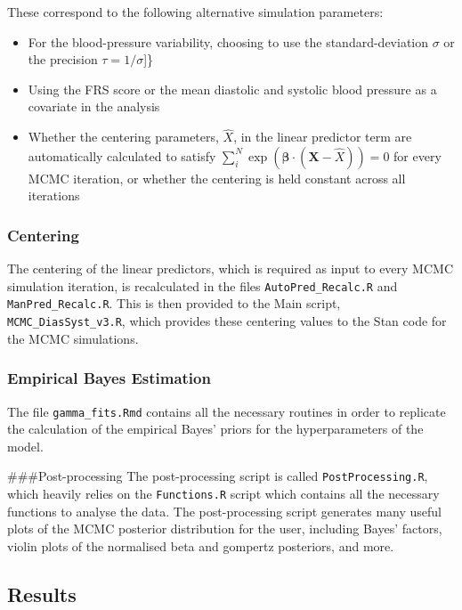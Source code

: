 \documentclass[
]{article}
\providecommand{\tightlist}{%
  \setlength{\itemsep}{0pt}\setlength{\parskip}{0pt}}
\begin{document}
These correspond to the following alternative simulation parameters:

\begin{itemize}
\tightlist
\item
  For the blood-pressure variability, choosing to use the
  standard-deviation \(\sigma\) or the precision \(\tau=1/\sigma\){]}\}
\item
  Using the FRS score or the mean diastolic and systolic blood pressure
  as a covariate in the analysis
\item
  Whether the centering parameters, \(\hat{X}\), in the linear predictor
  term are automatically calculated to satisfy
  \(\sum_i^N \exp{(\boldsymbol{\beta}\cdot(\boldsymbol{X}-\hat{X}))}=0\)
  for every MCMC iteration, or whether the centering is held constant
  across all iterations
\end{itemize}

\hypertarget{centering}{%
\subsubsection{Centering}\label{centering}}

The centering of the linear predictors, which is required as input to
every MCMC simulation iteration, is recalculated in the files
\texttt{AutoPred\_Recalc.R} and \texttt{ManPred\_Recalc.R}. This is then
provided to the Main script, \texttt{MCMC\_DiasSyst\_v3.R}, which
provides these centering values to the Stan code for the MCMC
simulations.

\hypertarget{empirical-bayes-estimation}{%
\subsubsection{Empirical Bayes
Estimation}\label{empirical-bayes-estimation}}

The file \texttt{gamma\_fits.Rmd} contains all the necessary routines in
order to replicate the calculation of the empirical Bayes' priors for
the hyperparameters of the model.

\#\#\#Post-processing The post-processing script is called
\texttt{PostProcessing.R}, which heavily relies on the
\texttt{Functions.R} script which contains all the necessary functions
to analyse the data. The post-processing script generates many useful
plots of the MCMC posterior distribution for the user, including Bayes'
factors, violin plots of the normalised beta and gompertz posteriors,
and more.

\hypertarget{results}{%
\subsection{Results}\label{results}}
\end{document}
